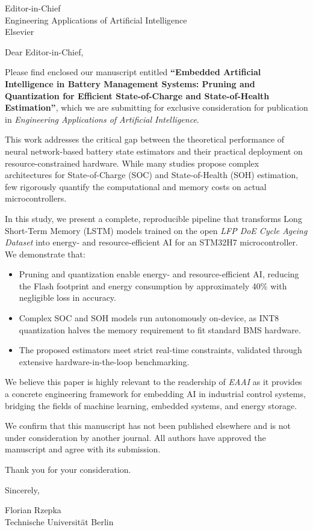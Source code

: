 \documentclass[11pt]{letter}
\date{\today}
\begin{document}
\begin{letter}{Editor-in-Chief\\
Engineering Applications of Artificial Intelligence\\
Elsevier}

\opening{Dear Editor-in-Chief,}

Please find enclosed our manuscript entitled \textbf{``Embedded Artificial Intelligence in Battery Management Systems: Pruning and Quantization for Efficient State-of-Charge and State-of-Health Estimation''}, which we are submitting for exclusive consideration for publication in \textit{Engineering Applications of Artificial Intelligence}.

This work addresses the critical gap between the theoretical performance of neural network-based battery state estimators and their practical deployment on resource-constrained hardware. While many studies propose complex architectures for State-of-Charge (SOC) and State-of-Health (SOH) estimation, few rigorously quantify the computational and memory costs on actual microcontrollers.

In this study, we present a complete, reproducible pipeline that transforms Long Short-Term Memory (LSTM) models trained on the open \textit{LFP DoE Cycle Ageing Dataset} into energy- and resource-efficient AI for an STM32H7 microcontroller. We demonstrate that:
\begin{itemize}
    \item Pruning and quantization enable energy- and resource-efficient AI, reducing the Flash footprint and energy consumption by approximately 40\% with negligible loss in accuracy.
    \item Complex SOC and SOH models run autonomously on-device, as INT8 quantization halves the memory requirement to fit standard BMS hardware.
    \item The proposed estimators meet strict real-time constraints, validated through extensive hardware-in-the-loop benchmarking.
\end{itemize}

We believe this paper is highly relevant to the readership of \textit{EAAI} as it provides a concrete engineering framework for embedding AI in industrial control systems, bridging the fields of machine learning, embedded systems, and energy storage.

We confirm that this manuscript has not been published elsewhere and is not under consideration by another journal. All authors have approved the manuscript and agree with its submission.

Thank you for your consideration.

Sincerely,

Florian Rzepka\\
Technische Universität Berlin
\end{letter}
\end{document}
